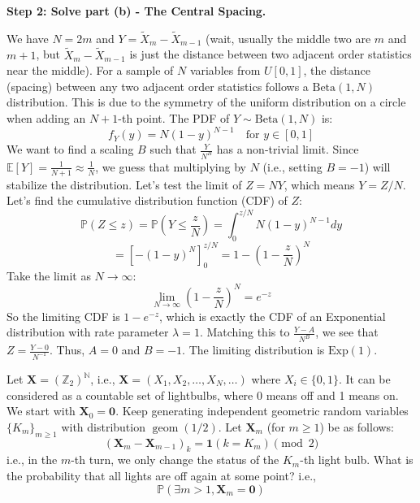 \begin{solution}
\textbf{Step 2: Solve part (b) - The Central Spacing.}

We have $N = 2m$ and $Y = \tilde{X}_m - \tilde{X}_{m-1}$ (wait, usually the middle two are $m$ and $m+1$, but $\tilde{X}_m - \tilde{X}_{m-1}$ is just the distance between two adjacent order statistics near the middle).
For a sample of $N$ variables from $U[0,1]$, the distance (spacing) between any two adjacent order statistics follows a $\text{Beta}(1, N)$ distribution. This is due to the symmetry of the uniform distribution on a circle when adding an $N+1$-th point.
The PDF of $Y \sim \text{Beta}(1, N)$ is:
\[ f_Y(y) = N(1-y)^{N-1} \quad \text{for } y \in [0, 1] \]
We want to find a scaling $B$ such that $\frac{Y}{N^B}$ has a non-trivial limit.
Since $\mathbb{E}[Y] = \frac{1}{N+1} \approx \frac{1}{N}$, we guess that multiplying by $N$ (i.e., setting $B = -1$) will stabilize the distribution. Let's test the limit of $Z = NY$, which means $Y = Z/N$.
Let's find the cumulative distribution function (CDF) of $Z$:
\[ \mathbb{P}(Z \leq z) = \mathbb{P}\left(Y \leq \frac{z}{N}\right) = \int_0^{z/N} N(1-y)^{N-1} dy \]
\[ = \left[ -(1-y)^N \right]_0^{z/N} = 1 - \left(1 - \frac{z}{N}\right)^N \]
Take the limit as $N \to \infty$:
\[ \lim_{N \to \infty} \left(1 - \frac{z}{N}\right)^N = e^{-z} \]
So the limiting CDF is $1 - e^{-z}$, which is exactly the CDF of an Exponential distribution with rate parameter $\lambda = 1$.
Matching this to $\frac{Y - A}{N^B}$, we see that $Z = \frac{Y - 0}{N^{-1}}$.
Thus, $A = 0$ and $B = -1$.
The limiting distribution is $\text{Exp}(1)$.
\end{solution}

\begin{exercise}\label{probability:2018:7}
Let $\mathbf{X} = (\mathbb{Z}_2)^\mathbb{N}$, i.e., $\mathbf{X} = (X_1, X_2, \dots, X_N, \dots)$ where $X_i \in \{0, 1\}$. It can be considered as a countable set of lightbulbs, where 0 means off and 1 means on. We start with $\mathbf{X}_0 = \mathbf{0}$. Keep generating independent geometric random variables $\{K_m\}_{m \geq 1}$ with distribution $\operatorname{geom}(1/2)$. Let $\mathbf{X}_m$ (for $m \geq 1$) be as follows:
\[
(\mathbf{X}_m - \mathbf{X}_{m-1})_k = \mathbf{1}(k = K_m) \pmod{2}
\]
i.e., in the $m$-th turn, we only change the status of the $K_m$-th light bulb. What is the probability that all lights are off again at some point? i.e.,
\[
\mathbb{P}(\exists m > 1, \mathbf{X}_m = \mathbf{0})
\]
\end{exercise}

